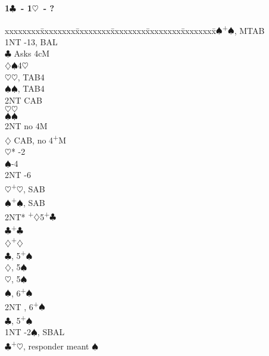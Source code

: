 \documentclass[10pt]{article}
\renewcommand{\c}{$\clubsuit$}
\renewcommand{\d}{$\diamondsuit$}
\newcommand{\h}{$\heartsuit$}
\newcommand{\s}{$\spadesuit$}
\newcommand{\p}{\textsuperscript{+}}
\newenvironment{bidtable}[1][]
{\textbf{#1}
  \begin{adjustwidth}{1em}{}
    \addvspace{2pt}
    \begin{tabbing}
      xxxxxxxx\=xxxxxxxx\=xxxxxxxx\=xxxxxxxx\=xxxxxxxx\=xxxxxxxx\=\kill}
{\end{tabbing}\end{adjustwidth}\bigskip}%
\begin{document}
\begin{multicols*}{2}
\newpage
\begin{bidtable}[1\c\ - 1\h\ - ?]
1\s {}\p\s, MTAB                                  \\
    \> 1NT -13, BAL                            \\
    \>     \c  \> Asks 4cM                      \\
    \>     \>      \d       {}\s 4\h          \\
    \>     \>      \>           \h {}\h, TAB4 \\
    \>     \>      \>           \s {}\s, TAB4 \\
    \>     \>      \>           \> 2NT \> CAB       \\
    \>     \>      \h       {}\h              \\
    \>     \>      \s       {}\s              \\
    \>     \>      \> 2NT       \> no 4M            \\
    \>     \d  \> CAB, no 4\p M                 \\
    \>     \>      \h*      {}-2              \\
    \>     \>      \s       {}-4              \\
    \>     \>      \> 2NT       -6              \\
    \>     \h  {}\p\h, SAB                    \\
    \>     \s  {}\p\s, SAB                    \\
    \>     \> 2NT* \p\d 5\p\c                   \\
    \>     \c  {}\p\c                         \\
    \>     \d  {}\p\d                         \\
    \c {}, 5\p\s                              \\
    \d {}, 5\s                                \\
    \h {}, 5\s                                \\
    \s {}, 6\p\s                              \\
    \> 2NT , 6\p\s                              \\
    \c {}, 5\p\s                              \\
1NT -2\s, SBAL                                  \\
    \c {}\p\h, responder meant \s             \\

\end{bidtable}
\end{multicols*}
\end{document}
